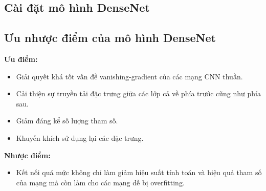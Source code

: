 \subsection{Cài đặt mô hình DenseNet}


\subsection{Ưu nhược điểm của mô hình DenseNet}
\textbf{Ưu điểm:}
\begin{itemize}
	\item Giải quyết khá tốt vấn đề vanishing-gradient của các mạng CNN thuần.
	\item Cải thiện sự truyền tải đặc trưng giữa các lớp cả về phía trước cũng như phía sau.
	\item Giảm đáng kể số lượng tham số.
	\item Khuyến khích sử dụng lại các đặc trưng.
\end{itemize}
\textbf{Nhược điểm:}
\begin{itemize}
	\item Kết nối quá mức không chỉ làm giảm hiệu suất tính toán và hiệu quả tham số của mạng mà còn làm cho các mạng dễ bị overfitting. \cite{densenet_disadvantage}
\end{itemize}